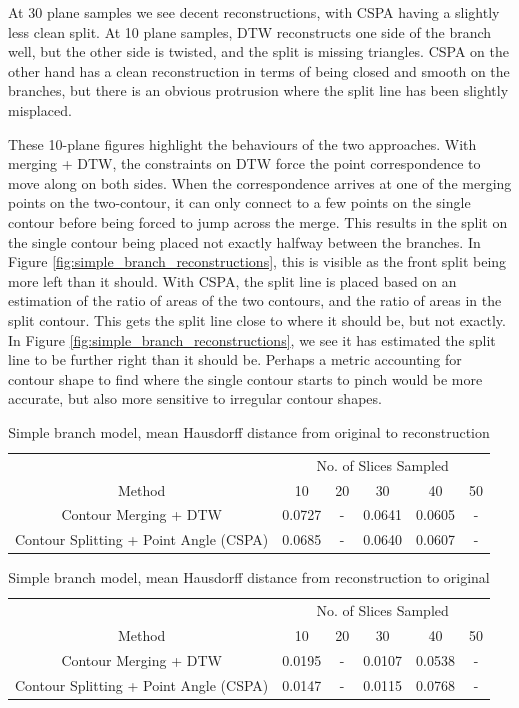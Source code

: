 \documentclass[11p, titlepage]{article}
\begin{document}
At 30 plane samples we see decent reconstructions, with CSPA having a slightly less clean split. At 10 plane samples, DTW reconstructs one side of the branch well, but the other side is twisted, and the split is missing triangles. CSPA on the other hand has a clean reconstruction in terms of being closed and smooth on the branches, but there is an obvious protrusion where the split line has been slightly misplaced. 

These 10-plane figures highlight the behaviours of the two approaches. With merging + DTW, the constraints on DTW force the point correspondence to move along on both sides. When the correspondence arrives at one of the merging points on the two-contour, it can only connect to a few points on the single contour before being forced to jump across the merge. This results in the split on the single contour being placed not exactly halfway between the branches. In Figure \ref{fig:simple_branch_reconstructions}, this is visible as the front split being more left than it should. With CSPA, the split line is placed based on an estimation of the ratio of areas of the two contours, and the ratio of areas in the split contour. This gets the split line close to where it should be, but not exactly. In Figure \ref{fig:simple_branch_reconstructions}, we see it has estimated the split line to be further right than it should be. Perhaps a metric accounting for contour shape to find where the single contour starts to pinch would be more accurate, but also more sensitive to irregular contour shapes.

\begin{table}[h!]
\begin{tabular}{ | c | c | c | c | c | c | }
\hline
& \multicolumn{5}{c|}{No. of Slices Sampled} \\
\cline{2-6}
Method & 10 & 20 & 30 & 40 & 50 \\
\hline
Contour Merging + DTW & 0.0727 & - & 0.0641 & 0.0605 & - \\
Contour Splitting + Point Angle (CSPA) & 0.0685 & - & 0.0640 & 0.0607 & - \\
\hline
\end{tabular}
\caption{Simple branch model, mean Hausdorff distance from original to reconstruction}
\label{table:simple_branch_forward}
\end{table}
\FloatBarrier

\begin{table}[h!]
\begin{tabular}{ | c | c | c | c | c | c | }
\hline
& \multicolumn{5}{c|}{No. of Slices Sampled} \\
\cline{2-6}
Method & 10 & 20 & 30 & 40 & 50 \\
\hline
Contour Merging + DTW & 0.0195 & - & 0.0107 & 0.0538 & - \\
Contour Splitting + Point Angle (CSPA) & 0.0147 & - & 0.0115 & 0.0768 & - \\
\hline
\end{tabular}
\caption{Simple branch model, mean Hausdorff distance from reconstruction to original}
\label{table:simple_branch_reverse}
\end{table}
\FloatBarrier
\end{document}
